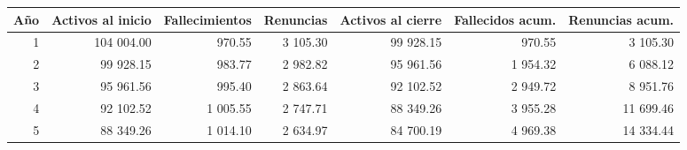 \begin{tabular}{rrrrrrr}
\toprule
Año & Activos al inicio & Fallecimientos & Renuncias & Activos al cierre & Fallecidos acum. & Renuncias acum. \\
\midrule
1 & 104 004.00 & 970.55 & 3 105.30 & 99 928.15 & 970.55 & 3 105.30 \\
2 & 99 928.15 & 983.77 & 2 982.82 & 95 961.56 & 1 954.32 & 6 088.12 \\
3 & 95 961.56 & 995.40 & 2 863.64 & 92 102.52 & 2 949.72 & 8 951.76 \\
4 & 92 102.52 & 1 005.55 & 2 747.71 & 88 349.26 & 3 955.28 & 11 699.46 \\
5 & 88 349.26 & 1 014.10 & 2 634.97 & 84 700.19 & 4 969.38 & 14 334.44 \\
\bottomrule
\end{tabular}
